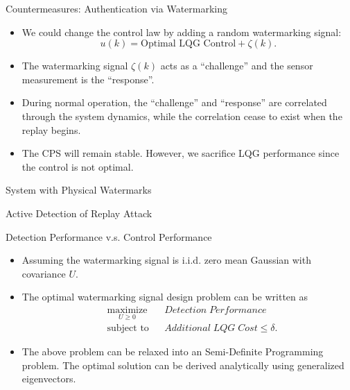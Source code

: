 \documentclass[10pt]{beamer}
\newlength\figureheight
\newlength\figurewidth
\newcommand{\tikzdir}[1]{#1.tikz}
\newcommand{\inputtikz}[1]{}}
\begin{document}
  \begin{frame}{Countermeasures: Authentication via Watermarking}
    \begin{itemize}
      \item We could change the control law by adding a random watermarking signal:
	\begin{displaymath}
	  u(k) = \text{Optimal LQG Control}+ \zeta(k).
	\end{displaymath}
      \item The watermarking signal $\zeta(k)$ acts as a ``challenge'' and the sensor measurement is the ``response''. 
      \item During normal operation, the ``challenge'' and ``response'' are correlated through the system dynamics, while the correlation cease to exist when the replay begins.
      \item The CPS will remain stable. However, we sacrifice LQG performance since the control is not optimal.
    \end{itemize}
  \end{frame}

\begin{frame}{System with Physical Watermarks}
    \begin{figure}[htpb]
      \begin{center}
	\inputtikz{replaywithphywatermark}
      \end{center}
    \end{figure}
\end{frame}

\begin{frame}{Active Detection of Replay Attack}
  \setlength{\figureheight}{6cm}
  \setlength{\figurewidth}{7cm}
    \begin{figure}[htpb]
      \begin{center}
	\inputtikz{replay1}
      \end{center}
    \end{figure}
\end{frame}

\begin{frame}{Detection Performance v.s. Control Performance}
  \begin{itemize}
  \item Assuming the watermarking signal is i.i.d. zero mean Gaussian with covariance $U$.
  \item The optimal watermarking signal design problem can be written as
    \begin{align*}
      &\mathop{\textrm{maximize}}\limits_{U\geq 0}&
      & Detection\;Performance\\
      &\textrm{subject to}&
      & Additional\;LQG\;Cost \leq \delta.
    \end{align*}
  \item The above problem can be relaxed into an Semi-Definite Programming problem. The optimal solution can be derived analytically using generalized eigenvectors.
  \end{itemize}
\end{frame}
\end{document}
